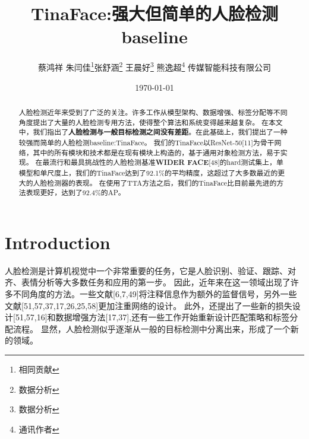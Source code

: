 \documentclass[twocolumn,10pt,a4paper]{article}%
\title{\fontsize{18pt}{27pt}\selectfont%
	{\heiti%
	TinaFace:强大但简单的人脸检测baseline
	}}%
\author{\fontsize{12pt}{18pt}\selectfont%
	{\fangsong%
	{蔡鸿祥 朱闫佳}\thanks{相同贡献}张舒涵\thanks{数据分析} 王晨好\thanks{数据分析} 熊逸超\thanks{通讯作者} 
	传媒智能科技有限公司}\\%
	\fontsize{10.5pt}{15.75pt}\selectfont%
}
\date{\today}%
\begin{document}
	\maketitle%
	 
	\lhead{}%
	\chead{}%
	\rhead{}%
	\lfoot{}%
	\cfoot{\thepage}%
	\rfoot{}%
	 
	\begin{abstract}
		人脸检测近年来受到了广泛的关注。许多工作从模型架构、数据增强、标签分配等不同角度提出了大量的人脸检测专用方法，使得整个算法和系统变得越来越复杂。
		在本文中，我们指出了\textbf{人脸检测与一般目标检测之间没有差距}。在此基础上，我们提出了一种较强而简单的人脸检测baseline:TinaFace。
		我们的TinaFace以ResNet-50[11]为骨干网络，其中的所有模块和技术都是在现有模块上构造的，基于通用对象检测方法，易于实现。
		在最流行和最具挑战性的人脸检测基准\textbf{WIDER FACE}[48]的hard测试集上，单模型和单尺度上，我们的TinaFace达到了92.1\%的平均精度，这超过了大多数最近的更大的人脸检测器的表现。
		在使用了TTA方法之后，我们的TinaFace比目前最先进的方法表现更好，达到了92.4\%的AP。
	\end{abstract}
	
	

	
	
	\section{Introduction}
	人脸检测是计算机视觉中一个非常重要的任务，它是人脸识别、验证、跟踪、对齐、表情分析等大多数任务和应用的第一步。
	因此，近年来在这一领域出现了许多不同角度的方法。一些文献[6,7,49]将注释信息作为额外的监督信号，另外一些文献[51,57,37,17,26,25,58]更加注重网络的设计。
	此外，还提出了一些新的损失设计[51,57,16]和数据增强方法[17,37],还有一些工作开始重新设计匹配策略和标签分配流程。
	显然，人脸检测似乎逐渐从一般的目标检测中分离出来，形成了一个新的领域。
\end{document}
